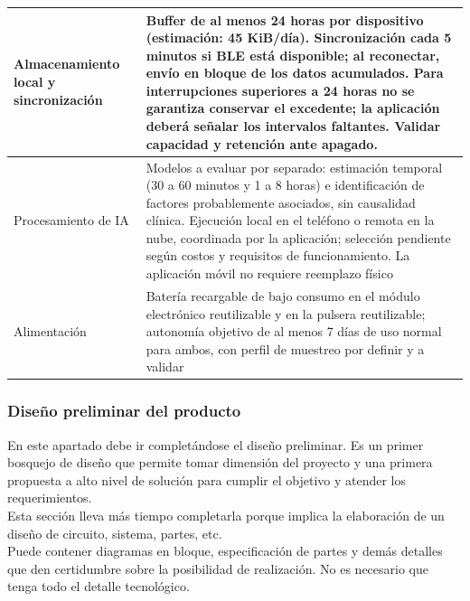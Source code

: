 {\begin{xltabular}{\textwidth}{|>{\raggedright\arraybackslash}p{0.28\textwidth}|>{\raggedright\arraybackslash}X|}
\hline
Almacenamiento local y sincronización & Buffer de al menos 24 horas por dispositivo (estimación: 45 KiB/día). Sincronización cada 5 minutos si BLE está disponible; al reconectar, envío en bloque de los datos acumulados. Para interrupciones superiores a 24 horas no se garantiza conservar el excedente; la aplicación deberá señalar los intervalos faltantes. Validar capacidad y retención ante apagado. \\
\hline
Procesamiento de IA & Modelos a evaluar por separado: estimación temporal (30 a 60 minutos y 1 a 8 horas) e identificación de factores probablemente asociados, sin causalidad clínica. Ejecución local en el teléfono o remota en la nube, coordinada por la aplicación; selección pendiente según costos y requisitos de funcionamiento. La aplicación móvil no requiere reemplazo físico \\
\hline
Alimentación & Batería recargable de bajo consumo en el módulo electrónico reutilizable y en la pulsera reutilizable; autonomía objetivo de al menos 7 días de uso normal para ambos, con perfil de muestreo por definir y a validar \\
\hline
\end{xltabular}
\par}


\subsubsection{Diseño preliminar del producto}
{\consigna
En este apartado debe ir completándose el diseño preliminar. Es un primer bosquejo de diseño que permite tomar dimensión del proyecto y una primera propuesta a alto nivel de solución para cumplir el objetivo y atender los requerimientos.\\
Esta sección lleva más tiempo completarla porque implica la elaboración de un diseño de circuito, sistema, partes, etc.\\
Puede contener diagramas en bloque, especificación de partes y demás detalles que den certidumbre sobre la posibilidad de realización. No es necesario que tenga todo el detalle tecnológico.
}

